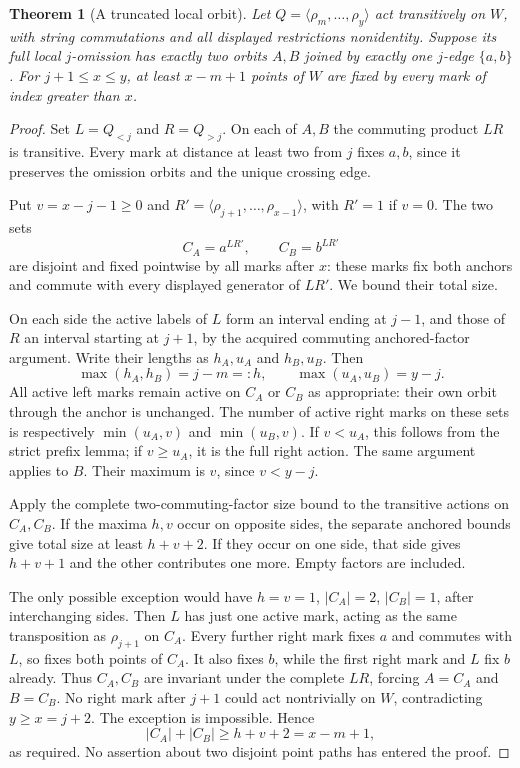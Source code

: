 \documentclass[11pt,a4paper]{article}
\newtheorem{theorem}[lemma]{Theorem}
\newcommand{\gen}[1]{\langle#1\rangle}
\begin{document}
\begin{theorem}[A truncated local orbit]
Let $Q=\gen{\rho_m,\ldots,\rho_y}$ act transitively
on $W$, with string commutations and all displayed
restrictions nonidentity. Suppose its full local
$j$-omission has exactly two orbits $A,B$ joined
by exactly one $j$-edge $\{a,b\}$. For
$j+1\le x\le y$, at least $x-m+1$ points of $W$
are fixed by every mark of index greater than $x$.
\end{theorem}
\begin{proof}
Set $L=Q_{<j}$ and $R=Q_{>j}$. On each of $A,B$
the commuting product $LR$ is transitive. Every
mark at distance at least two from $j$ fixes
$a,b$, since it preserves the omission orbits
and the unique crossing edge.

Put $v=x-j-1\ge0$ and
$R'=\gen{\rho_{j+1},\ldots,\rho_{x-1}}$, with
$R'=1$ if $v=0$. The two sets
\[
                     C_A=a^{LR'},\qquad C_B=b^{LR'}
\]
are disjoint and fixed pointwise by all marks
after $x$: these marks fix both anchors and
commute with every displayed generator of $LR'$.
We bound their total size.

On each side the active labels of $L$ form an
interval ending at $j-1$, and those of $R$ an
interval starting at $j+1$, by the acquired
commuting anchored-factor argument. Write their
lengths as $h_A,u_A$ and $h_B,u_B$. Then
\[
 \max(h_A,h_B)=j-m=:h,\qquad \max(u_A,u_B)=y-j.
\]
All active left marks remain active on $C_A$ or
$C_B$ as appropriate: their own orbit through
the anchor is unchanged. The number of active
right marks on these sets is respectively
$\min(u_A,v)$ and $\min(u_B,v)$. If $v<u_A$,
this follows from the strict prefix lemma;
if $v\ge u_A$, it is the full right action.
The same argument applies to $B$. Their maximum
is $v$, since $v<y-j$.

Apply the complete two-commuting-factor size
bound to the transitive actions on $C_A,C_B$.
If the maxima $h,v$ occur on opposite sides,
the separate anchored bounds give total size
at least $h+v+2$. If they occur on one side,
that side gives $h+v+1$ and the other contributes
one more. Empty factors are included.

The only possible exception would have $h=v=1$,
$|C_A|=2$, $|C_B|=1$, after interchanging sides.
Then $L$ has just one active mark, acting as the
same transposition as $\rho_{j+1}$ on $C_A$.
Every further right mark fixes $a$ and commutes
with $L$, so fixes both points of $C_A$. It also
fixes $b$, while the first right mark and $L$
fix $b$ already. Thus $C_A,C_B$ are invariant
under the complete $LR$, forcing $A=C_A$ and
$B=C_B$. No right mark after $j+1$ could act
nontrivially on $W$, contradicting $y\ge x=j+2$.
The exception is impossible. Hence
\[
 |C_A|+|C_B|\ge h+v+2=x-m+1,
\]
as required. No assertion about two disjoint
point paths has entered the proof.
\end{proof}
\end{document}
